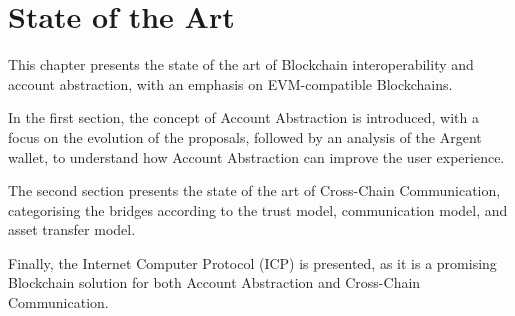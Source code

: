 \chapter{State of the Art}
\label{chap:state_of_the_art}

This chapter presents the state of the art of Blockchain interoperability and account abstraction, with an emphasis on EVM-compatible Blockchains.\cite{evm} 

In the first section, the concept of Account Abstraction is introduced, with a focus on the evolution of the proposals, followed by an analysis of the Argent wallet, to understand how Account Abstraction can improve the user experience.

The second section presents the state of the art of Cross-Chain Communication, categorising the bridges according to the trust model, communication model, and asset transfer model. 

Finally, the Internet Computer Protocol (ICP) is presented, as it is a promising Blockchain solution for both Account Abstraction and Cross-Chain Communication. 




